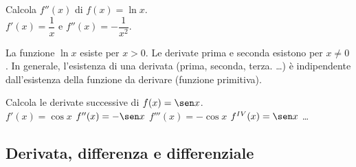 \begin{esempio}
Calcola $f''(x)$ di $f(x)=\ln x$.\\
$f'(x)=\dfrac{1}{x}$ e $f''(x)=-\dfrac{1}{x^2}$.\\
\begin{osservazione}
 La funzione $\ln x $ esiste per $x>0$. Le derivate prima e seconda esistono
 per $x\ne 0$.
 In generale, l'esistenza di una derivata (prima, seconda, terza. \dots) è
 indipendente dall'esistenza della funzione da derivare (funzione 
primitiva).
\end{osservazione}
\end{esempio}

\begin{esempio}
 Calcola le derivate successive di $f(x)=\sen x$.\\
 $f'(x)=\cos x$ \hspace{1cm}$ f''(x)=-\sen x$ \hspace{1cm}
 $f'''(x)=-\cos x$ \hspace{1cm} $f^{IV}(x)=\sen x$ \dots
\end{esempio}


\subsection{Derivata, differenza e differenziale}
\label{subsec:diff01_deridiff}

